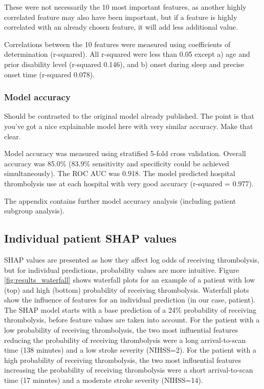These were not necessarily the 10 most important features, as another highly correlated feature may also have been important, but if a feature is highly correlated with an already chosen feature, it will add less additional value.

Correlations between the 10 features were measured using coefficients of determination (r-squared). All r-squared were less than 0.05 except a) age and prior disability level (r-squared 0.146), and b) onset during sleep and precise onset time (r-squared 0.078).


\subsubsection{Model accuracy}

Should be contrasted to the original model already published.  The point is that you've got a nice explainable model here with very similar accuracy.  Make that clear.

Model accuracy was measured using stratified 5-fold cross validation. Overall accuracy was 85.0\% (83.9\% sensitivity and specificity could be achieved simultaneously). The ROC AUC was 0.918. The model predicted hospital thrombolysis use at each hospital with very good accuracy (r-squared = 0.977).

The appendix contains further model accuracy analysis (including patient subgroup analysis).

\subsection{Individual patient SHAP values}
SHAP values are presented as how they affect log odds of receiving thrombolysis, but for individual predictions, probability values are more intuitive. Figure \ref{fig:results_waterfall} shows waterfall plots for an example of a patient with low (top) and high (bottom) probability of receiving thrombolysis. Waterfall plots show the influence of features for an individual prediction (in our case, patient). The SHAP model starts with a base prediction of a 24\% probability of receiving thrombolysis, before feature values are taken into account. For the patient with a low probability of receiving thrombolysis, the two most influential features reducing the probability of receiving thrombolysis were a long arrival-to-scan time (138 minutes) and a low stroke severity (NIHSS=2). For the patient with a high probability of receiving thrombolysis, the two most influential features increasing the probability of receiving thrombolysis were a short arrival-to-scan time (17 minutes) and a moderate stroke severity (NIHSS=14). 

